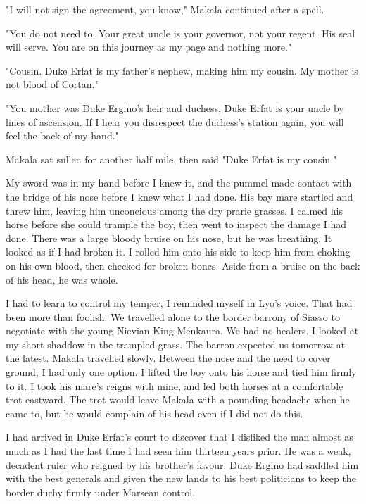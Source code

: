 \documentclass{article}
\begin{document}
"I will not sign the agreement, you know," Makala continued after a spell.

"You do not need to. Your great uncle is your governor, not your regent. His seal will serve. You are on this journey as my page and nothing more."

"Cousin. Duke Erfat is my father's nephew, making him my cousin. My mother is not blood of Cortan."

"You mother was Duke Ergino's heir and duchess, Duke Erfat is your uncle by lines of ascension. If I hear you disrespect the duchess's station again, you will feel the back of my hand."

Makala sat sullen for another half mile, then said "Duke Erfat is my cousin."

My sword was in my hand before I knew it, and the pummel made contact with the bridge of his nose before I knew what I had done. His bay mare startled and threw him, leaving him unconcious among the dry prarie grasses. I calmed his horse before she could trample the boy, then went to inspect the damage I had done. There was a large bloody bruise on his nose, but he was breathing. It looked as if I had broken it. I rolled him onto his side to keep him from choking on his own blood, then checked for broken bones. Aside from a bruise on the back of his head, he was whole. 

I had to learn to control my temper, I reminded myself in Lyo's voice. That had been more than foolish. We travelled alone to the border barrony of Siasso to negotiate with the young Nievian King Menkaura. We had no healers. I looked at my short shaddow in the trampled grass. The barron expected us tomorrow at the latest. Makala travelled slowly. Between the nose and the need to cover ground, I had only one option. I lifted the boy onto his horse and tied him firmly to it. I took his mare's reigns with mine, and led both horses at a comfortable trot eastward. The trot would leave Makala with a pounding headache when he came to, but he would complain of his head even if I did not do this.

I had arrived in Duke Erfat's court to discover that I disliked the man almost as much as I had the last time I had seen him thirteen years prior. He was a weak, decadent ruler who reigned by his brother's favour. Duke Ergino had saddled him with the best generals and given the new lands to his best politicians to keep the border duchy firmly under Marsean control. 
\end{document}
